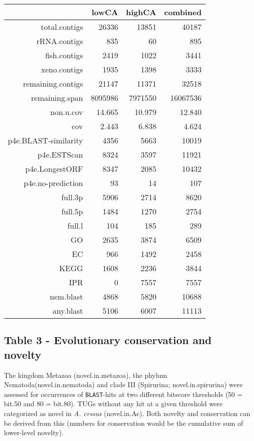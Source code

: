 \documentclass[10pt]{bmc_article}
\newenvironment{bmcformat}{\begin{raggedright}\baselineskip20pt\sloppy\setboolean{publ}{false}}{\end{raggedright}\baselineskip20pt\sloppy}
\begin{document}
\begin{bmcformat}
\begin{table}[ht]
\begin{center}
\begin{tabular}{rrrr}
  \hline
 & lowCA & highCA & combined \\ 
  \hline
total.contigs & 26336 & 13851 & 40187 \\ 
  rRNA.contigs & 835 & 60 & 895 \\ 
  fish.contigs & 2419 & 1022 & 3441 \\ 
  xeno.contigs & 1935 & 1398 & 3333 \\ 
  remaining.contigs & 21147 & 11371 & 32518 \\ 
  remaining.span & 8095986 & 7971550 & 16067536 \\ 
  non.u.cov & 14.665 & 10.979 & 12.840 \\ 
  cov & 2.443 & 6.838 & 4.624 \\ 
  p4e.BLAST-similarity & 4356 & 5663 & 10019 \\ 
  p4e.ESTScan & 8324 & 3597 & 11921 \\ 
  p4e.LongestORF & 8347 & 2085 & 10432 \\ 
  p4e.no-prediction & 93 & 14 & 107 \\ 
  full.3p & 5906 & 2714 & 8620 \\ 
  full.5p & 1484 & 1270 & 2754 \\ 
  full.l & 104 & 185 & 289 \\ 
  GO & 2635 & 3874 & 6509 \\ 
  EC & 966 & 1492 & 2458 \\ 
  KEGG & 1608 & 2236 & 3844 \\ 
  IPR & 0 & 7557 & 7557 \\ 
  nem.blast & 4868 & 5820 & 10688 \\ 
  any.blast & 5106 & 6007 & 11113 \\ 
   \hline
\end{tabular}
\end{center}
\end{table}
\subsection*{Table 3 - Evolutionary conservation and novelty}

The kingdom Metazoa (novel.in.metazoa), the phylum
Nematoda(novel.in.nematoda) and clade III (Spirurina;
novel.in.spirurina) were assessed for occurrences of
\texttt{BLAST}-hits at two different bitscore thresholds (50 = bit.50
and 80 = bit.80). TUGs without any hit at a given threshold were
categorized as novel in \textit{A. crssus} (novel.in.Ac).  Both
novelty and conservation can be derived from this (numbers for
conservation would be the cumulative sum of lower-level novelty).


\end{bmcformat}
\end{document}
